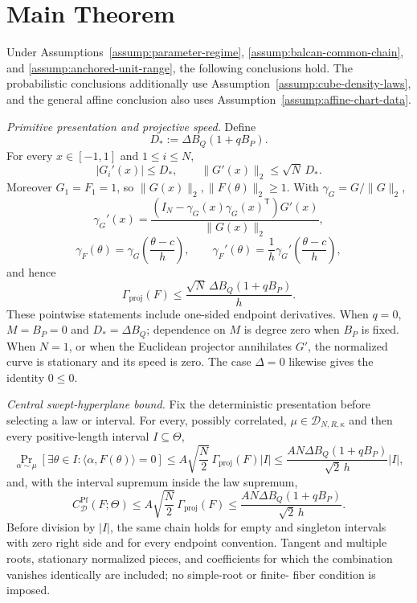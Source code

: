 \section{Main Theorem}

\begin{theorem}
\label{thm:main}
Under Assumptions~\ref{assump:parameter-regime},
\ref{assump:balcan-common-chain}, and
\ref{assump:anchored-unit-range}, the following conclusions hold.  The
probabilistic conclusions additionally use
Assumption~\ref{assump:cube-density-laws}, and the general affine conclusion
also uses Assumption~\ref{assump:affine-chart-data}.

\emph{Primitive presentation and projective speed.}
Define
\[
D_*:=\Delta B_Q(1+qB_P).
\]
For every $x\in[-1,1]$ and $1\leq i\leq N$,
\[
|G_i'(x)|\leq D_*,
\qquad
\|G'(x)\|_2\leq\sqrt N\,D_*.
\]
Moreover $G_1=F_1=1$, so $\|G(x)\|_2,\|F(\theta)\|_2\geq1$.  With
$\gamma_G=G/\|G\|_2$,
\[
\gamma_G'(x)
=\frac{(I_N-\gamma_G(x)\gamma_G(x)^{\mathsf T})G'(x)}{\|G(x)\|_2},
\]
\[
\gamma_F(\theta)=\gamma_G\!\left(\frac{\theta-c}{h}\right),
\qquad
\gamma_F'(\theta)=\frac1h\gamma_G'\!\left(\frac{\theta-c}{h}\right),
\]
and hence
\[
\Gamma_{\mathrm{proj}}(F)
\leq\frac{\sqrt N\,\Delta B_Q(1+qB_P)}{h}.
\tag{R1}
\]
These pointwise statements include one-sided endpoint derivatives.  When
$q=0$, $M=B_P=0$ and $D_*=\Delta B_Q$; dependence on $M$ is degree zero
when $B_P$ is fixed.  When $N=1$, or when the Euclidean projector annihilates
$G'$, the normalized curve is stationary and its speed is zero.  The case
$\Delta=0$ likewise gives the identity $0\leq0$.

\emph{Central swept-hyperplane bound.}
Fix the deterministic presentation before selecting a law or interval.  For
every, possibly correlated, $\mu\in\mathcal D_{N,R,\kappa}$ and then every
positive-length interval $I\subseteq\Theta$,
\[
\Pr_{\alpha\sim\mu}
 [\exists\theta\in I:\langle\alpha,F(\theta)\rangle=0]
\leq A\sqrt{\frac N2}\,\Gamma_{\mathrm{proj}}(F)|I|
\leq\frac{AN\Delta B_Q(1+qB_P)}{\sqrt2\,h}|I|,
\tag{R2a}
\]
and, with the interval supremum inside the law supremum,
\[
C^{\mathrm{Pf}}_{\mathcal D}(F;\Theta)
\leq A\sqrt{\frac N2}\,\Gamma_{\mathrm{proj}}(F)
\leq\frac{AN\Delta B_Q(1+qB_P)}{\sqrt2\,h}.
\tag{R2b}
\]
Before division by $|I|$, the same chain holds for empty and singleton
intervals with zero right side and for every endpoint convention.  Tangent
and multiple roots, stationary normalized pieces, and coefficients for which
the combination vanishes identically are included; no simple-root or finite-
fiber condition is imposed.


\end{theorem}
